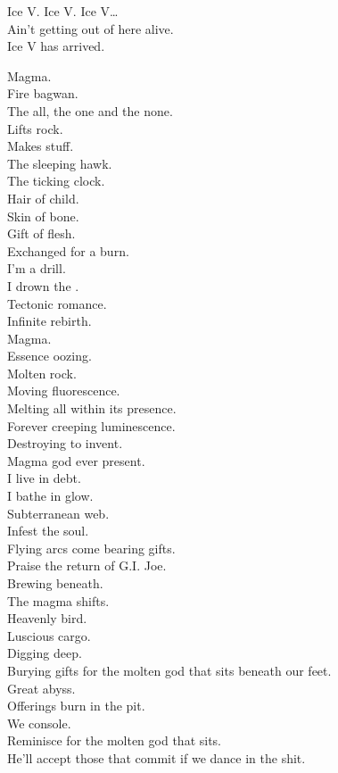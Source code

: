 Ice V. Ice V. Ice V… \\

Ain't getting out of here alive. \\
Ice V has arrived. \\




Magma. \\
Fire bagwan. \\
The all, the one and the none. \\
Lifts rock. \\
Makes stuff. \\
The sleeping hawk. \\
The ticking clock. \\
Hair of child. \\
Skin of bone. \\
Gift of flesh. \\
Exchanged for a burn. \\
I'm a drill. \\
I drown the . \\
Tectonic romance. \\
Infinite rebirth. \\

Magma. \\
Essence oozing. \\
Molten rock. \\
Moving fluorescence. \\
Melting all within its presence. \\
Forever creeping luminescence. \\
Destroying to invent. \\
Magma god ever present. \\
I live in debt. \\
I bathe in glow. \\
Subterranean web. \\
Infest the soul. \\
Flying arcs come bearing gifts. \\
Praise the return of G.I. Joe. \\
Brewing beneath. \\
The magma shifts. \\
Heavenly bird. \\
Luscious cargo. \\
Digging deep. \\
Burying gifts for the molten god that sits beneath our feet. \\
Great abyss. \\
Offerings burn in the pit. \\
We console. \\
Reminisce for the molten god that sits. \\
He'll accept those that commit if we dance in the shit. \\

